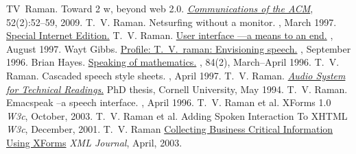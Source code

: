\documentclass{article}
\begin{document}
\begin{plainbibliography}{}
TV~Raman.
\newblock Toward 2 w, beyond web 2.0.
\newblock \href{http://emacspeak.sourceforge.net/raman/publications/beyond-web20-cacm-2009/}{\em Communications of the ACM}, 52(2):52--59, 2009.
 T.~V. Raman.  
\newblock Netsurfing without a monitor.  
, March 1997.
\newblock \href{http://www.sciam.com/0397issue/0397raman.html}%
{Special Internet Edition.}
 T.~V.  Raman.  
\newblock
\href{http://www.ddj.com/editorial/1997/raman.htm}%
{User interface ---a means to an end.}  
, August 1997.
 Wayt Gibbs.  
\newblock
\href{http://www.sciam.com/0996issue/0996profile.html}%
{Profile: T.\ V.\ raman: Envisioning speech.}  
, September 1996.
 Brian Hayes.
\newblock  \href{http://www.amsci.org/amsci/issues/Comsci96/compsci96-03.html}%
{Speaking of mathematics.}  
,
84(2), March--April 1996.
 T.~V. Raman.  
\newblock Cascaded speech
  style sheets.  
, April
  1997.
 T.~V.  Raman.  
\newblock
\href{http://www.cs.cornell.edu/home/raman/aster/aster-toplevel.html}%
{{\em Audio System for Technical Readings}.}  
\newblock PhD
thesis, Cornell University, May 1994.
 T.~V.  Raman.  
\newblock Emacspeak --a
  speech interface.  
, April 1996.
 T.~V.  Raman et al.  
\newblock XForms
  1.0 
\newblock \emph{W3c}, October, 2003.  
\newblock
 T.~V.  Raman et al.  
\newblock
  {Adding Spoken Interaction To XHTML} 
\newblock \emph{W3c},
  December, 2001.  
 T.~V.  Raman 
\newblock
  \href{http://www.sys-con.com/xml/article.cfm?id=578}%
{Collecting Business Critical Information Using XForms} 
\newblock
  \emph{XML Journal}, April, 2003.
\end{plainbibliography}

\begin{center}
  \end{center}
\longpage
\end{document}
